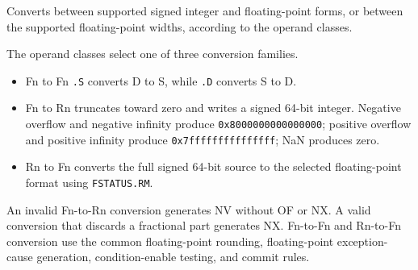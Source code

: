 Converts between supported signed integer and floating-point forms, or between the supported floating-point widths, according to the operand classes.

The operand classes select one of three conversion families.

\begin{itemize}
\item Fn to Fn \texttt{.S} converts D to S, while \texttt{.D} converts S to D.
\item Fn to Rn truncates toward zero and writes a signed 64-bit integer. Negative overflow and negative infinity
produce \texttt{0x8000000000000000}; positive overflow and positive infinity produce
\texttt{0x7fffffffffffffff}; NaN produces zero.
\item Rn to Fn converts the full signed 64-bit source to the selected floating-point format using
\texttt{FSTATUS.RM}.
\end{itemize}
An invalid Fn-to-Rn conversion generates NV without OF or NX. A valid conversion that discards a fractional part
generates NX. Fn-to-Fn and Rn-to-Fn conversion use the common floating-point rounding, floating-point
exception-cause generation, condition-enable testing, and commit rules.
